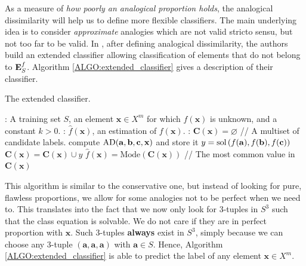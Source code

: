 As a measure of \textit{how poorly an analogical proportion holds}, the
analogical dissimilarity will help us to define more flexible classifiers.  The
main underlying idea is to consider {\it approximate} analogies which are not
valid stricto sensu, but not too far to be valid.
In \cite{BayMicDelIJCAI07}, after defining analogical dissimilarity,  the authors
build an extended classifier allowing classification of elements that do not
belong to $\mathbf{E}_{S}^{f}$. Algorithm \ref{ALGO:extended_classifier} gives a
description of their classifier.

\begin{algorithm}[!ht]
 \caption{The extended classifier.}
       \label{ALGO:extended_classifier}
       \begin{algorithmic}

      : A training set $S$, an element $\mathbf{x} \in X^m$
         for which $f(\mathbf{x})$ is unknown, and a constant $k > 0$.
         : $\hat{f}(\mathbf{x})$, an estimation of
         $f(\mathbf{x})$.
    : $\mathbf{C}(\mathbf{x}) = \varnothing$ \quad \quad // A
    multiset of candidate labels.
         \STATE compute $\text{AD}(\mathbf{a}, \mathbf{b}, \mathbf{c}, \mathbf{x})$ and store it
	    \ENDFOR
        \STATE $y = \text{sol}\left(f(\mathbf{a}), f(\mathbf{b}), f(\mathbf{c})\right)$
    \STATE $ \mathbf{C}(\mathbf{x}) = \mathbf{C}(\mathbf{x}) \cup y$
    \ENDFOR
    \STATE $\hat{f}(\mathbf{x}) = \text{Mode} (\mathbf{C}(\mathbf{x}))$ // The
         most common value in $\mathbf{C}(\mathbf{x})$
\end{algorithmic}
\end{algorithm}


This algorithm is similar to the conservative one, but instead of looking for
pure, flawless proportions, we allow for some analogies not to be perfect when
we need to. This translates into the fact that we now only
look for $3$-tuples in $S^3$ such that the class equation is solvable. We do
not care if they are in perfect proportion with $\mathbf{x}$. Such
$3$-tuples \textbf{always} exist in $S^3$, simply because we can choose any
$3$-tuple $(\mathbf{a}, \mathbf{a}, \mathbf{a})$ with $\mathbf{a} \in S$.
Hence, Algorithm \ref{ALGO:extended_classifier} is able to predict the label of
any element $\mathbf{x} \in X^m$.

